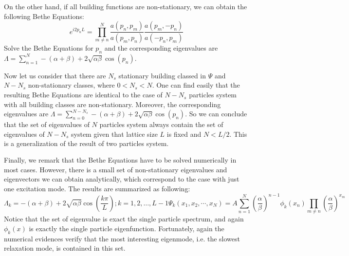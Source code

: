 \documentclass[aps,showpacs,twocolumn,floatfix,prx,superscriptaddress]{revtex4-1}
\begin{document}
On the other hand, if all building functions are non-stationary, we can obtain the following Bethe Equations:
\begin{equation}
    \label{eq:betheEqN}
    e^{i2p_nL}  =  \prod_{m\neq n}^N\frac{a(p_n, p_m)}{a(p_m, p_n)} 
    \frac{a(p_m, -p_n)}{a(-p_n, p_m)}
\end{equation}
Solve the Bethe Equations for $p_n$ and the corresponding eigenvalues are $\Lambda=\sum_{n=1}^N -(\alpha+\beta) + 2\sqrt{\alpha\beta}\cos(p_n)$. 

Now let us consider that there are $N_s$ stationary building classed in $\Psi$ and $N-N_s$ non-stationary classes, where $0<N_s<N$. One can find easily that the resulting Bethe Equations are identical to the case of $N-N_s$ particles system with all building classes are non-stationary. Moreover, the corresponding eigenvalues are $\Lambda = \sum_{n=0}^{N-N_s} -(\alpha+\beta)+2\sqrt{\alpha\beta}\cos(p_n)$. So we can conclude that the set of eigenvalues of $N$ particles system always contain the set of eigenvalues of $N-N_s$ system given that lattice size $L$ is fixed and $N<L/2$. This is a generalization of the result of two particles system.

Finally, we remark that the Bethe Equations have to be solved numerically in most cases. However, there is a small set of non-stationary eigenvalues and eigenvectors we can obtain analytically, which correspond to the case with just one excitation mode. The results are summarized as following:  
\begin{subequations}
    \label{eq:eigenN}
    \begin{equation}
        \label{eq:partEigenvaluesN}
        \Lambda_k   = -(\alpha+\beta) + 2\sqrt{\alpha\beta}\cos(\frac{k\pi}{L}); 
        k=1,2,\dots, L-1  
    \end{equation}
    \begin{equation}
        \label{eq:eigenvectorsN}
        \Psi_k(x_1, x_2, \cdots, x_N)  =  A \sum_{n=1}^N
        \left(\frac{\alpha}{\beta}\right)^{n-1} \phi_k(x_n)\prod_{m\neq n} 
         \left(\frac{\alpha}{\beta}\right)^{x_m}
    \end{equation}
\end{subequations}
Notice that the set of eigenvalue is exact the single particle spectrum, and again $\phi_k(x)$ is exactly the single particle eigenfunction.  Fortunately, again the numerical evidences verify that the most interesting eigenmode, i.e. the slowest relaxation mode, is contained in this set.  
\end{document}
